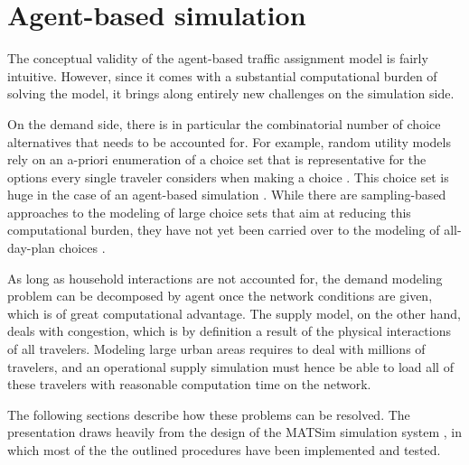 
\section{Agent-based simulation}
\label{sec:agent-based-simul}

The conceptual validity of the agent-based traffic assignment model is fairly intuitive. However, since it comes with a substantial computational burden of solving the model, it brings along entirely new challenges on the simulation side.

On the demand side, there is in particular the combinatorial number of choice alternatives that needs  to be accounted for. For example, random utility models rely on an a-priori enumeration of a choice set that is representative for the options every single traveler considers when making a choice \citep[][]{ben-akiva-1985}. This choice set is huge in the case of an agent-based simulation \citep[][]{bowman-1998}. While there are sampling-based approaches to the modeling of large choice sets that aim at reducing this computational burden, they have not yet been carried over to the modeling of all-day-plan choices \citep[][]{ben-akiva-1985, frejinger-2009, bierlaire-2011a}.

As long as household interactions are not accounted for, the demand modeling problem can be decomposed by agent once the network conditions are given, which is of great computational advantage. The supply model, on the other hand, deals with congestion, which is by definition a result of the physical interactions of all travelers. Modeling large urban areas requires to deal with millions of travelers, and an operational supply simulation must hence be able to load all of these travelers with reasonable computation time on the network. 

The following sections describe how these problems can be
resolved. The presentation draws heavily from the design of the MATSim
simulation system \citep{raney-2006, matsim}, in which most of the the outlined 
procedures have been implemented and tested.

